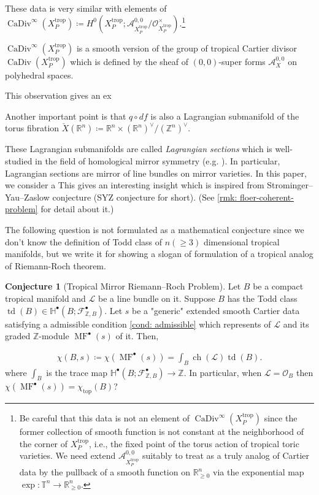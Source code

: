 \documentclass[a4paper,dvipdfmx,reqno,12pt]{amsart}
\theoremstyle{definition}
\newtheorem{Conj}[Thm]{Conjecture}
\newcommand{\deq}{\coloneqq}
\newcommand{\R}{\mathbb{R}}%
\newcommand{\Z}{\mathbb{Z}}%
\newcommand{\mb}[1]{\mathbb{#1}}%
\newcommand{\mcal}[1]{\mathcal{#1}}%
\newcommand{\opn}[1]{\operatorname{#1}}
\numberwithin{equation}{section}
\begin{document}
These data is very similar with elements of 
$\opn{CaDiv}^{\infty}(X_{P}^{\opn{trop}})\deq H^{0}(X_{P}^{\opn{trop}};
\mcal{A}^{0,0}_{X_{P}^{\opn{trop}}}/
\mathcal{O}^{\times}_{X_{P}^{\opn{trop}}})$.\footnote{
Be careful that this data is not an element
of $\opn{CaDiv}^{\infty}(X_{P}^{\opn{trop}})$ since
 the former collection of smooth function is not constant
at the neighborhood of the corner of $X_{P}^{\opn{trop}}$,
i.e., the fixed point of the torus action of tropical 
toric varieties.
We need extend $\mcal{A}^{0,0}_{X_{P}^{\opn{trop}}}$
suitably to treat as a truly analog of Cartier data by
the pullback of a smooth function on $\R_{\geq 0}^{n}$ via 
the exponential map $\opn{exp}\colon \mb{T}^{n}\to \R_{\geq 0}^{n}$.}



$\opn{CaDiv}^{\infty}(X_{P}^{\opn{trop}})$ is a
smooth version of the group of tropical Cartier divisor
$\opn{CaDiv}(X_{P}^{\opn{trop}})$ 
\cite[Definition 4.2]{jellLefschetzTheoremTropical2018a}
which is defined by the sheaf of $(0,0)$-super forms 
$\mcal{A}^{0,0}_X$ on 
polyhedral spaces.

This observation gives an ex

Another important point is that $q\circ df$ is also a Lagrangian
submanifold of the torus fibration $\check{X}(\R^{n})\deq \R^{n}\times (\R^{n})^{\vee}/(\Z^{n})^{\vee}$.


These Lagrangian submanifolds are called
\emph{Lagrangian sections} 
which is well-studied in the field of homological 
mirror symmetry 
(e.g. \cite{MR1882331}).
In particular, Lagrangian sections are mirror of line bundles on
mirror varieties. 
In this paper, we consider a 
This gives an interesting insight which is inspired from
Strominger--Yau--Zaslow conjecture 
(SYZ conjecture for short).
(See \cref{rmk: floer-coherent-problem} 
for detail about it.)

The following question is not formulated as a mathematical 
conjecture since we don't know the definition of Todd 
class of $n(\geq 3)$ dimensional tropical manifolds,
but we write it for showing a slogan of formulation 
of a tropical analog of Riemann-Roch theorem.

\begin{Conj}[{Tropical Mirror Riemann--Roch Problem}]
Let $B$ be a compact tropical manifold and $\mcal{L}$
be a line bundle on it. Suppose $B$ has the Todd class
$\opn{td}(B) \in \mb{H}^{\bullet}(B;\mcal{F}_{\Z, B}^{\bullet})$.
 Let $s$ be a "generic"
extended smooth Cartier data satisfying a admissible condition 
\cref{cond: admissible} which represents of $\mcal{L}$
and its graded $\Z$-module $\opn{MF}^{\bullet}(s)$
of it. Then,

\begin{align}
\chi(B,s)  \deq \chi(\opn{MF}^{\bullet}(s))=\int_B \opn{ch}(\mcal{L})\opn{td}(B).
\end{align}
where $\int_B$ is the trace map $\mb{H}^{\bullet}(B;\mcal{F}_{\Z, B}^{\bullet})\to \Z$.
In particular, when $\mcal{L}=\mcal{O}_B$ then
$\chi(\opn{MF}^{\bullet}(s))=\chi_{\opn{top}}(B)$?
\end{Conj}
\end{document}
